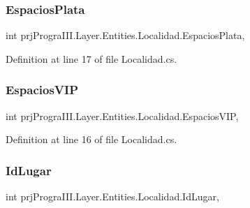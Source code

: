 \subsubsection{\texorpdfstring{Espacios\+Plata}{EspaciosPlata}}
{\footnotesize\ttfamily int prj\+Progra\+I\+I\+I.\+Layer.\+Entities.\+Localidad.\+Espacios\+Plata\hspace{0.3cm}{\ttfamily [get]}, {\ttfamily [set]}}



Definition at line 17 of file Localidad.\+cs.

\hypertarget{classprj_progra_i_i_i_1_1_layer_1_1_entities_1_1_localidad_a807e76002420aa7d0bd9b3d3e7b13e0d}{}\label{classprj_progra_i_i_i_1_1_layer_1_1_entities_1_1_localidad_a807e76002420aa7d0bd9b3d3e7b13e0d} 
\subsubsection{\texorpdfstring{Espacios\+V\+IP}{EspaciosVIP}}
{\footnotesize\ttfamily int prj\+Progra\+I\+I\+I.\+Layer.\+Entities.\+Localidad.\+Espacios\+V\+IP\hspace{0.3cm}{\ttfamily [get]}, {\ttfamily [set]}}



Definition at line 16 of file Localidad.\+cs.

\hypertarget{classprj_progra_i_i_i_1_1_layer_1_1_entities_1_1_localidad_a7b37c8d6ac9bfdf9014ff06f2c16a6ed}{}\label{classprj_progra_i_i_i_1_1_layer_1_1_entities_1_1_localidad_a7b37c8d6ac9bfdf9014ff06f2c16a6ed} 
\subsubsection{\texorpdfstring{Id\+Lugar}{IdLugar}}
{\footnotesize\ttfamily int prj\+Progra\+I\+I\+I.\+Layer.\+Entities.\+Localidad.\+Id\+Lugar\hspace{0.3cm}{\ttfamily [get]}, {\ttfamily [set]}}



